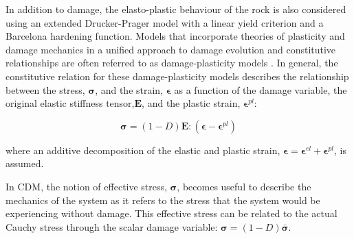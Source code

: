 In addition to damage, the elasto-plastic behaviour of the rock is also considered using an extended Drucker-Prager model with a linear yield criterion and a Barcelona hardening function. Models that incorporate theories of plasticity and damage mechanics in a unified approach to damage evolution and constitutive relationships are often referred to as damage-plasticity models \citep{zhang_continuum_2010}. In general, the constitutive relation for these damage-plasticity models describes the relationship between the stress, $\boldsymbol{\sigma}$, and the strain, $\boldsymbol{\epsilon}$ as a function of the damage variable, the original elastic stiffness tensor,$\mathbf{E}$, and the plastic strain, $\boldsymbol{\epsilon}^{pl}$: 

\begin{equation}
\boldsymbol{\sigma}=\left(1-D\right)\mathbf{E}:\left(\boldsymbol{\epsilon}-\boldsymbol{\epsilon}^{pl}\right)
\label{eqn:const5}
\end{equation}

where an additive decomposition of the elastic and plastic strain, $\boldsymbol{\epsilon}=\boldsymbol{\epsilon}^{el}+\boldsymbol{\epsilon}^{pl}$, is assumed.

In CDM, the notion of effective stress, $\boldsymbol{\sigma}$, becomes useful to describe the mechanics of the system as it refers to the stress that the system would be experiencing without damage. This effective stress can be related to the actual Cauchy stress through the scalar damage variable: $\boldsymbol{\sigma}=\left(1-D\right)\bar{\boldsymbol{\sigma}}$.
